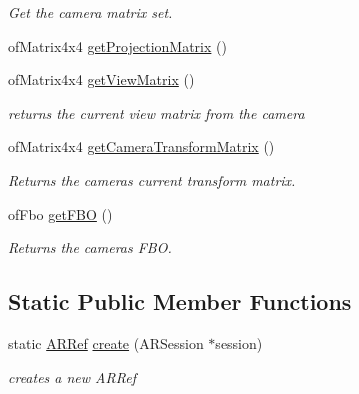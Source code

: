 \begin{DoxyCompactItemize}
\begin{DoxyCompactList}\small\item\em Get the camera matrix set. \end{DoxyCompactList}\item 
of\+Matrix4x4 \hyperlink{class_a_r_processor_a0f7cf764c73a8fc3964be088156766ea}{get\+Projection\+Matrix} ()
\item 
of\+Matrix4x4 \hyperlink{class_a_r_processor_a2e1d4cde9029bad28ac797c94e73096a}{get\+View\+Matrix} ()
\begin{DoxyCompactList}\small\item\em returns the current view matrix from the camera \end{DoxyCompactList}\item 
of\+Matrix4x4 \hyperlink{class_a_r_processor_aea093b6d054daa0c75de6f7a492a19ff}{get\+Camera\+Transform\+Matrix} ()
\begin{DoxyCompactList}\small\item\em Returns the camera\textquotesingle{}s current transform matrix. \end{DoxyCompactList}\item 
of\+Fbo \hyperlink{class_a_r_processor_a8436dc786e91fb933879d90a4ab396d5}{get\+F\+BO} ()
\begin{DoxyCompactList}\small\item\em Returns the camera\textquotesingle{}s F\+BO. \end{DoxyCompactList}\end{DoxyCompactItemize}
\subsection*{Static Public Member Functions}
\begin{DoxyCompactItemize}
\item 
static \hyperlink{_a_r_processor_8h_aa8c5643290d0692cc71388c3f0f1623a}{A\+R\+Ref} \hyperlink{class_a_r_processor_affa1cf36e94e3015c436fd30626dd773}{create} (A\+R\+Session $\ast$session)
\begin{DoxyCompactList}\small\item\em creates a new A\+R\+Ref \end{DoxyCompactList}\end{DoxyCompactItemize}
